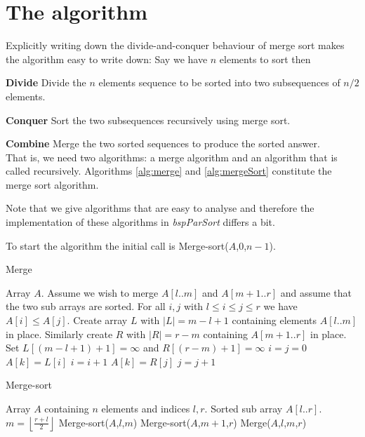 \documentclass[a4paper,12pt,article]{memoir}
\theoremstyle{plain}
\theoremstyle{definition}
\theoremstyle{remark}
\theoremstyle{plain}
\theoremstyle{remark}
\begin{document}
\section{The algorithm}
Explicitly writing down the divide-and-conquer behaviour of merge sort makes the algorithm easy to write down: Say we have $n$ elements to sort then

\textbf{Divide} Divide the $n$ elements sequence to be sorted into two subsequences of $n/2$ elements. 

\textbf{Conquer} Sort the two subsequences recursively using merge sort. 

\textbf{Combine} Merge the two sorted sequences to produce the sorted answer.  
\\
That is, we need two algorithms: a merge algorithm and an algorithm that is called recursively. Algorithms \ref{alg:merge} and \ref{alg:mergeSort} constitute the merge sort algorithm. 

Note that we give algorithms that are easy to analyse and therefore the implementation of these algorithms in \textit{bspParSort} differs a bit. 

To start the algorithm the initial call is Merge-sort($A$,$0$,$n-1$).

\begin{algorithm}
\caption{Merge}
\label{alg:merge}
\begin{algorithmic}[1]
\Require Array $A$. Assume we wish to merge $A[l..m]$ and $A[m+1..r]$ and assume that the two sub arrays are sorted. 
\Ensure For all $i,j$ with $l\leq i\leq j\leq r$ we have $A[i]\leq A[j]$. 
\State Create array $L$ with $\vert L\vert =m-l+1$ containing elements $A[l..m]$ in place. Similarly create $R$ with $\vert R\vert=r-m$ containing $A[m+1..r]$ in place. 
\State Set $L[(m-l+1)+1]=\infty$ and $R[(r-m)+1]=\infty$
\State $i=j=0$
\State $A[k]=L[i]$
\State $i=i+1$
\Else 
\State $A[k]=R[j]$
\State $j=j+1$
\EndIf
\EndFor
\end{algorithmic}
\end{algorithm}

\begin{algorithm}
\caption{Merge-sort}
\label{alg:mergeSort}
\begin{algorithmic}[1]
\Require Array $A$ containing $n$ elements and indices $l,r$. 
\Ensure Sorted sub array $A[l..r]$. 
\State $m=\left\lfloor \frac{r+l}{2}\right\rfloor$
\State Merge-sort($A$,$l$,$m$)
\State Merge-sort($A$,$m+1$,$r$)
\State Merge($A$,$l$,$m$,$r$)
\EndIf
\end{algorithmic}
\end{algorithm}
\end{document}
